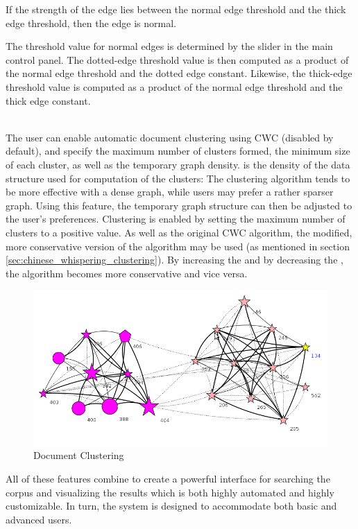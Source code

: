 \begin{description}
If the strength of the edge lies between the normal edge threshold and the thick edge threshold, then the edge is normal.

The threshold value for normal edges is determined by the slider in the main control panel. The dotted-edge threshold value is then computed as a product of the normal edge threshold and the dotted edge constant. Likewise, the thick-edge threshold value is computed as a product of the normal edge threshold and the thick edge constant.
\item[\scare{Clustering Settings}] \hfill \\
The user can enable automatic document clustering using CWC (disabled by default), and specify the
maximum number of clusters formed, the minimum size of each cluster, as well as the temporary graph
density.  is the density of the data structure used for computation of the
clusters: The clustering algorithm tends to be more effective with a dense graph, while users may
prefer a rather sparser graph. Using this feature, the temporary graph structure can then be
adjusted to the user's preferences. Clustering is enabled by setting the maximum number of clusters
to a positive value. As well as the original CWC algorithm, the modified, more conservative version
of the algorithm may be used (as mentioned in section \ref{sec:chinese_whispering_clustering}). By
increasing the  and by decreasing the , the algorithm becomes more conservative and vice versa.

\begin{figure}[ht]
\centering
\caption{Document Clustering}
\includegraphics[width=120mm]{clustering.png}
\end{figure}

\end{description}

All of these features combine to create a powerful interface for searching the corpus and visualizing the results which is both highly automated and highly customizable. In turn, the system is designed to accommodate both basic and advanced users.
